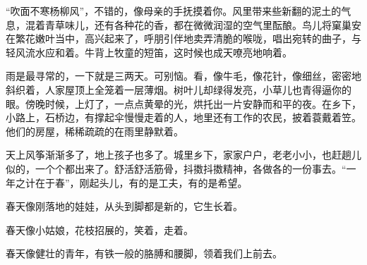 \documentclass[letterpaper,12pt,english]{sphinxmanual}
\begin{document}
“吹面不寒杨柳风”，不错的，像母亲的手抚摸着你。风里带来些新翻的泥土的气息，混着青草味儿，还有各种花的香，都在微微润湿的空气里酝酿。鸟儿将窠巢安在繁花嫩叶当中，高兴起来了，呼朋引伴地卖弄清脆的喉咙，唱出宛转的曲子，与轻风流水应和着。牛背上牧童的短笛，这时候也成天嘹亮地响着。

雨是最寻常的，一下就是三两天。可别恼。看，像牛毛，像花针，像细丝，密密地斜织着，人家屋顶上全笼着一层薄烟。树叶儿却绿得发亮，小草儿也青得逼你的眼。傍晚时候，上灯了，一点点黄晕的光，烘托出一片安静而和平的夜。在乡下，小路上，石桥边，有撑起伞慢慢走着的人，地里还有工作的农民，披着蓑戴着笠。他们的房屋，稀稀疏疏的在雨里静默着。

天上风筝渐渐多了，地上孩子也多了。城里乡下，家家户户，老老小小，也赶趟儿似的，一个个都出来了。舒活舒活筋骨，抖擞抖擞精神，各做各的一份事去。“一年之计在于春”，刚起头儿，有的是工夫，有的是希望。

春天像刚落地的娃娃，从头到脚都是新的，它生长着。

春天像小姑娘，花枝招展的，笑着，走着。

春天像健壮的青年，有铁一般的胳膊和腰脚，领着我们上前去。
\end{document}
